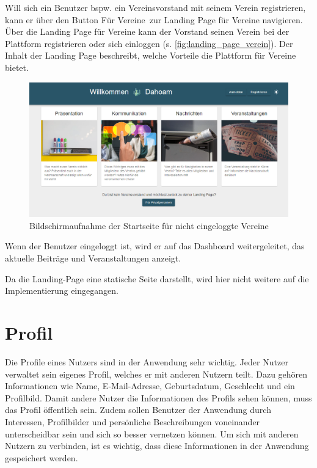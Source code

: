 Will sich ein Benutzer bspw. ein Vereinsvorstand mit seinem Verein registrieren, kann er über den Button \glqq Für Vereine\grqq \ zur Landing Page für Vereine navigieren. Über die Landing Page für Vereine kann der Vorstand seinen Verein bei der Plattform registrieren oder sich einloggen (s. \autoref{fig:landing_page_verein}). Der Inhalt der Landing Page beschreibt, welche Vorteile die Plattform für Vereine bietet.


\begin{figure}[!htb]
    \centering
    \includegraphics[width=.9\textwidth]{figures/boas/21_landing_page_verein.png}
    \caption[]{Bildschirmaufnahme der Startseite für nicht eingeloggte Vereine}
    \label{fig:landing_page_verein}
\end{figure}

Wenn der Benutzer eingeloggt ist, wird er auf das Dashboard weitergeleitet, das aktuelle Beiträge und Veranstaltungen anzeigt.

Da die Landing-Page eine statische Seite darstellt, wird hier nicht weitere auf die Implementierung eingegangen.


\section{Profil}
\label{sec:profile}

Die Profile eines Nutzers sind in der Anwendung sehr wichtig.
Jeder Nutzer verwaltet sein eigenes Profil, welches er mit anderen Nutzern teilt.
Dazu gehören Informationen wie Name, E-Mail-Adresse, Geburtsdatum, Geschlecht und ein Profilbild.
Damit andere Nutzer die Informationen des Profils sehen können, muss das Profil öffentlich sein.
Zudem sollen Benutzer der Anwendung durch Interessen, Profilbilder und persönliche Beschreibungen voneinander unterscheidbar sein und sich so besser vernetzen können.
Um sich mit anderen Nutzern zu verbinden, ist es wichtig, dass diese Informationen in der Anwendung gespeichert werden.

